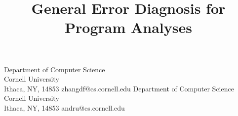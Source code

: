  
\usepackage{times,graphicx,color}
\usepackage{amsmath, amssymb, stmaryrd}
\usepackage{ttquot,utf8}
\usepackage[comments]{declarations}

\renewcommand{\floatpagefraction}{0.75}
\renewcommand{\dblfloatpagefraction}{0.75}

\title{General Error Diagnosis for Program Analyses}

\ifanonymous
\else
{}
           {Department of Computer Science\\ Cornell University\\ Ithaca, NY, 14853}
           {zhangdf@cs.cornell.edu}
           {Department of Computer Science\\ Cornell University\\ Ithaca, NY, 14853}
           {andru@cs.cornell.edu}
\fi


\maketitle
